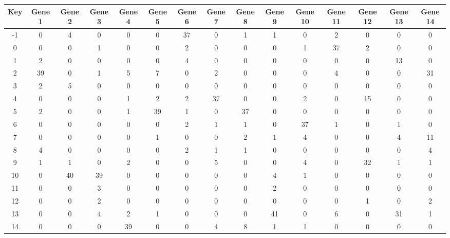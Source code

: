 \begin{tabular}{|c|c|c|c|c|c|c|c|c|c|c|c|c|c|c|}
\hline
Key & Gene 1 & Gene 2 & Gene 3 & Gene 4 & Gene 5 & Gene 6 & Gene 7 & Gene 8 & Gene 9 & Gene 10 & Gene 11 & Gene 12 & Gene 13 & Gene 14 \\
\hline
-1 & 0 & 4 & 0 & 0 & 0 & 37 & 0 & 1 & 1 & 0 & 2 & 0 & 0 & 0 \\
0 & 0 & 0 & 1 & 0 & 0 & 2 & 0 & 0 & 0 & 1 & 37 & 2 & 0 & 0 \\
1 & 2 & 0 & 0 & 0 & 0 & 4 & 0 & 0 & 0 & 0 & 0 & 0 & 13 & 0 \\
2 & 39 & 0 & 1 & 5 & 7 & 0 & 2 & 0 & 0 & 0 & 4 & 0 & 0 & 31 \\
3 & 2 & 5 & 0 & 0 & 0 & 0 & 0 & 0 & 0 & 0 & 0 & 0 & 0 & 0 \\
4 & 0 & 0 & 0 & 1 & 2 & 2 & 37 & 0 & 0 & 2 & 0 & 15 & 0 & 0 \\
5 & 2 & 0 & 0 & 1 & 39 & 1 & 0 & 37 & 0 & 0 & 0 & 0 & 0 & 0 \\
6 & 0 & 0 & 0 & 0 & 0 & 2 & 1 & 1 & 0 & 37 & 1 & 0 & 1 & 0 \\
7 & 0 & 0 & 0 & 0 & 1 & 0 & 0 & 2 & 1 & 4 & 0 & 0 & 4 & 11 \\
8 & 4 & 0 & 0 & 0 & 0 & 2 & 1 & 1 & 0 & 0 & 0 & 0 & 0 & 4 \\
9 & 1 & 1 & 0 & 2 & 0 & 0 & 5 & 0 & 0 & 4 & 0 & 32 & 1 & 1 \\
10 & 0 & 40 & 39 & 0 & 0 & 0 & 0 & 0 & 4 & 1 & 0 & 0 & 0 & 0 \\
11 & 0 & 0 & 3 & 0 & 0 & 0 & 0 & 0 & 2 & 0 & 0 & 0 & 0 & 0 \\
12 & 0 & 0 & 2 & 0 & 0 & 0 & 0 & 0 & 0 & 0 & 0 & 1 & 0 & 2 \\
13 & 0 & 0 & 4 & 2 & 1 & 0 & 0 & 0 & 41 & 0 & 6 & 0 & 31 & 1 \\
14 & 0 & 0 & 0 & 39 & 0 & 0 & 4 & 8 & 1 & 1 & 0 & 0 & 0 & 0 \\
\hline
\end{tabular}